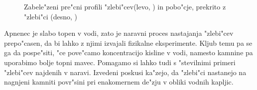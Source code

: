 \documentclass[a4paper,12pt]{article}
\begin{document}
\begin{figure}[h]
 \centering
 \caption{Zabele"zeni pre"cni profili "zlebi"cev(levo, \cite{gams}) in pobo"cje, prekrito z "zlebi"ci (desno, \cite{perne})}
\end{figure}


Apnenec je slabo topen v vodi, zato je naravni proces nastajanja "zlebi"cev prepo"casen, da bi lahko z njimi izvajali fizikalne eksperimente. Kljub temu pa se ga da pospe"siti, "ce pove"camo koncentracijo kisline v vodi, namesto kamnine pa uporabimo bolje topni mavec. Pomagamo si lahko tudi s "stevilnimi primeri "zlebi"cev najdenih v naravi. Izvedeni poskusi ka"zejo, da "zlebi"ci nastanejo na nagnjeni kamniti povr"sini pri enakomernem de"zju v obliki vodnih kapljic.
\end{document}
